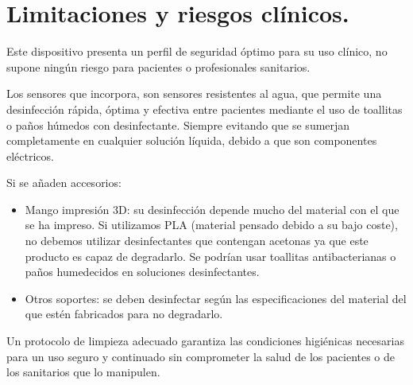 \section{Limitaciones y riesgos clínicos.}
Este dispositivo presenta un perfil de seguridad óptimo para su uso clínico, no supone ningún riesgo para pacientes o profesionales sanitarios. 

Los sensores que incorpora, son sensores resistentes al agua, que permite una desinfección rápida, óptima y efectiva entre pacientes mediante el uso de toallitas o paños húmedos con desinfectante. Siempre evitando que se sumerjan completamente en cualquier solución líquida, debido a que son componentes eléctricos.

Si se añaden accesorios:
\begin{itemize}
    \item Mango impresión 3D: su desinfección depende mucho del material con el que se ha impreso. Si utilizamos PLA (material pensado debido a su bajo coste), no debemos utilizar desinfectantes que contengan acetonas ya que este producto es capaz de degradarlo. Se podrían usar toallitas antibacterianas o paños humedecidos en soluciones desinfectantes.
    \item Otros soportes: se deben desinfectar según las especificaciones del material del que estén fabricados para no degradarlo.  
\end{itemize}

Un protocolo de limpieza adecuado garantiza las condiciones higiénicas necesarias para un uso seguro y continuado sin comprometer la salud de los pacientes o de los sanitarios que lo manipulen.